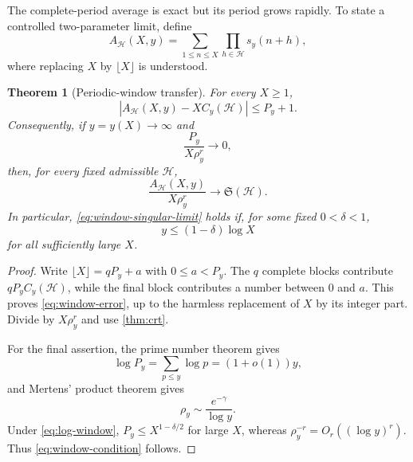 \documentclass[11pt]{article}
\newtheorem{theorem}{Theorem}[section]
\theoremstyle{definition}
\theoremstyle{remark}
\newcommand{\cH}{\mathcal H}
\begin{document}
The complete-period average is exact but its period grows rapidly.  To state a controlled two-parameter limit, define
\begin{equation}\label{eq:window-correlation}
    A_{\cH}(X,y)
    =\sum_{1\le n\le X}\prod_{h\in\cH}s_y(n+h),
\end{equation}
where replacing $X$ by $\lfloor X\rfloor$ is understood.

\begin{theorem}[Periodic-window transfer]\label{thm:window}
For every $X\ge1$,
\begin{equation}\label{eq:window-error}
    \left|A_{\cH}(X,y)-X C_y(\cH)\right|\le P_y+1.
\end{equation}
Consequently, if $y=y(X)\to\infty$ and
\begin{equation}\label{eq:window-condition}
    \frac{P_y}{X\rho_y^r}\longrightarrow0,
\end{equation}
then, for every fixed admissible $\cH$,
\begin{equation}\label{eq:window-singular-limit}
    \frac{A_{\cH}(X,y)}{X\rho_y^r}
    \longrightarrow\mathfrak S(\cH).
\end{equation}
In particular, \eqref{eq:window-singular-limit} holds if, for some fixed $0<\delta<1$,
\begin{equation}\label{eq:log-window}
    y\le(1-\delta)\log X
\end{equation}
for all sufficiently large $X$.
\end{theorem}

\begin{proof}
Write $\lfloor X\rfloor=qP_y+a$ with $0\le a<P_y$.  The $q$ complete blocks contribute $qP_yC_y(\cH)$, while the final block contributes a number between $0$ and $a$.  This proves \eqref{eq:window-error}, up to the harmless replacement of $X$ by its integer part.  Divide by $X\rho_y^r$ and use \cref{thm:crt}.

For the final assertion, the prime number theorem gives
\begin{equation}\label{eq:theta-asymptotic}
    \log P_y=\sum_{p\le y}\log p=(1+o(1))y,
\end{equation}
and Mertens' product theorem gives \citep[Chaps.~2 and 6]{MontgomeryVaughan2007}
\begin{equation}\label{eq:mertens-density}
    \rho_y\sim\frac{e^{-\gamma}}{\log y}.
\end{equation}
Under \eqref{eq:log-window}, $P_y\le X^{1-\delta/2}$ for large $X$, whereas $\rho_y^{-r}=O_r((\log y)^r)$.  Thus \eqref{eq:window-condition} follows.
\end{proof}
\end{document}
